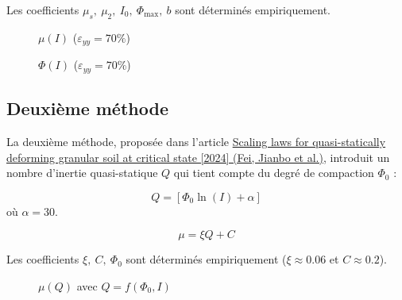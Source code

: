 \documentclass[a4paper,12pt]{report}
\begin{document}
Les coefficients $\mu_s,\ \mu_2,\ I_0,\ \Phi_{\max},\ b$ sont déterminés empiriquement.

\begin{figure}
    \centering
    {\small
        
    }
    \caption{$\mu(I)$ ($\varepsilon_{yy} = 70\%$)}
\end{figure}

\begin{figure}
    \centering
    {\small
        
    }
    \caption{$\Phi(I)$ ($\varepsilon_{yy} = 70\%$)}
\end{figure}

\subsection{Deuxième méthode}

La deuxième méthode, proposée dans l'article 
\href{https://link-springer-com.sid2nomade-1.grenet.fr/article/10.1007/s10035-024-01459-7}{Scaling laws for quasi-statically deforming granular soil at critical state [2024] (Fei, Jianbo et al.)}, 
introduit un nombre d'inertie quasi-statique $Q$ qui tient compte du degré de compaction $\Phi_0$ :

\[
Q = \left[ \Phi_0  \ln \left( I \right) + \alpha \right]
\]
où $\alpha = 30$.

\[
\mu = \xi Q + C
\]

Les coefficients $\xi,\ C,\ \Phi_0$ sont déterminés empiriquement ($\xi \approx 0.06$ et $C \approx 0.2$).

\begin{figure}
    \centering
    {\small
        
    }
    \caption{$\mu(Q)$ avec $Q = f(\Phi_0, I)$}
\end{figure}




\end{document}
